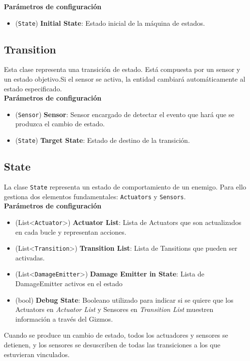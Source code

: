 \textbf{Parámetros de configuración}
\begin{itemize}
	\item (\texttt{State}) \textbf{Initial State}: Estado inicial de la máquina de estados.
\end{itemize}

\subsection{Transition}
Esta clase representa una transición de estado. Está compuesta por un sensor y un estado objetivo.Si el sensor se activa, la entidad cambiará automáticamente al estado especificado.\\

\textbf{Parámetros de configuración}
\begin{itemize}
	\item (\texttt{Sensor}) \textbf{Sensor}: Sensor encargado de detectar el evento que hará que se produzca el cambio de estado.
	\item (\texttt{State}) \textbf{Target State}: Estado de destino de la transición.
\end{itemize}

\subsection{State}

La clase \texttt{State} representa un estado de comportamiento de un enemigo. Para ello gestiona dos elementos fundamentales: \texttt{Actuators} y \texttt{Sensors}.\\
\textbf{Parámetros de configuración}
\begin{itemize}
	\item (List<\texttt{Actuator}>) \textbf{Actuator List}: Lista de Actuators que son actualizados en cada bucle y representan acciones.
	\item (List<\texttt{Transition}>) \textbf{Transition List}: Lista de Tansitions que pueden ser activadas.
	\item (List<\texttt{DamageEmitter}>) \textbf{Damage Emitter in State}: Lista de DamageEmitter activos en el estado
	\item (bool) \textbf{Debug State}: Booleano utilizado para indicar si se quiere que los Actuators en \textit{Actuator List} y Sensores en \textit{Transition List} muestren información a través del Gizmos.
\end{itemize}
Cuando se produce un cambio de estado, todos los actuadores y sensores se detienen, y los sensores se desuscriben de todas las transiciones a los que estuvieran vinculados.\\

